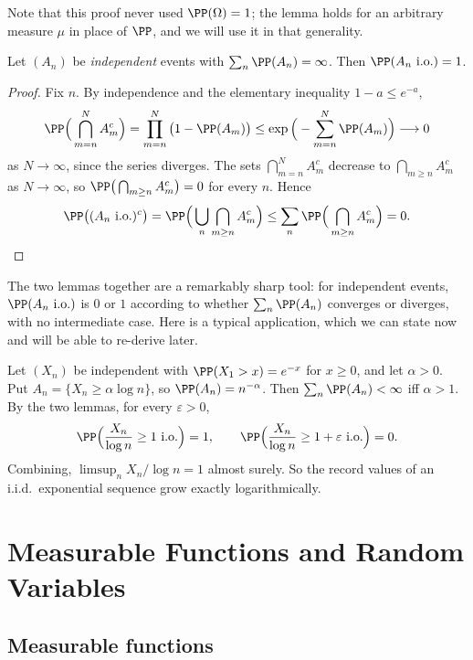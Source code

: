 Note that this proof never used $\PP(\Omega)=1$; the lemma holds for an arbitrary measure $\mu$ in place of $\PP$, and we will use it in that generality.

\begin{lemma}\label{lem:bc2}
	Let $(A_n)$ be \emph{independent} events with $\sum_n \PP(A_n) = \infty$. Then $\PP(A_n \text{ i.o.}) = 1$.
\end{lemma}
\begin{proof}
	Fix $n$. By independence and the elementary inequality $1 - a \leq e^{-a}$,
	$$
	\PP\Big( \bigcap_{m=n}^N A_m^c \Big) = \prod_{m=n}^N \big(1 - \PP(A_m)\big) \leq \exp\Big( - \sum_{m=n}^N \PP(A_m) \Big) \longrightarrow 0
	$$
	as $N \to \infty$, since the series diverges. The sets $\bigcap_{m=n}^N A_m^c$ decrease to $\bigcap_{m \geq n} A_m^c$ as $N \to \infty$, so $\PP\big( \bigcap_{m\geq n} A_m^c \big) = 0$ for every $n$. Hence
	$$
	\PP\big( (A_n \text{ i.o.})^c \big) = \PP\Big( \bigcup_n \bigcap_{m \geq n} A_m^c \Big) \leq \sum_n \PP\Big( \bigcap_{m\geq n} A_m^c\Big) = 0. \qedhere
	$$
\end{proof}

The two lemmas together are a remarkably sharp tool: for independent events, $\PP(A_n \text{ i.o.})$ is $0$ or $1$ according to whether $\sum_n \PP(A_n)$ converges or diverges, with no intermediate case. Here is a typical application, which we can state now and will be able to re-derive later.

\begin{example}\label{ex:exp-records}
	Let $(X_n)$ be independent with $\PP(X_1 > x) = e^{-x}$ for $x \geq 0$, and let $\alpha > 0$. Put $A_n = \{X_n \geq \alpha \log n\}$, so $\PP(A_n) = n^{-\alpha}$. Then $\sum_n \PP(A_n) < \infty$ iff $\alpha > 1$. By the two lemmas, for every $\varepsilon>0$,
	$$
	\PP\Big( \frac{X_n}{\log n} \geq 1 \text{ i.o.} \Big) = 1, \qquad \PP\Big( \frac{X_n}{\log n} \geq 1 + \varepsilon \text{ i.o.}\Big) = 0.
	$$
	Combining, $\limsup_n X_n / \log n = 1$ almost surely. So the record values of an i.i.d.\ exponential sequence grow exactly logarithmically.
\end{example}

\section{Measurable Functions and Random Variables}

\subsection{Measurable functions}

